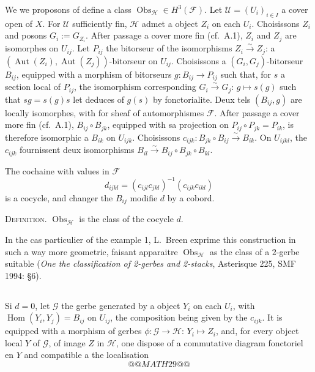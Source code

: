 \documentclass[11pt,a4paper]{article}
\theoremstyle{plain}
\theoremstyle{definition}
\DeclareMathOperator{\Hom}{Hom}
\DeclareMathOperator{\Aut}{Aut}
\DeclareMathOperator{\Obs}{Obs}
\newcommand{\iso}{\xrightarrow{\sim}}
\begin{document}
We we proposons of define a class $\Obs_{\mathcal{H}} \in H^{3}(\mathcal{F})$. Let $\mathcal{U} = (U_{i})_{i \in I}$
a cover open of $X$. For $\mathcal{U}$ sufficiently fin, $\mathcal{H}$ admet a object $Z_{i}$ on each $U_{i}$. Choisissons $Z_{i}$ and posons $G_{i} := G_{Z_{i}}$. After passage a cover more fin (cf.~A.1), $Z_{i}$ and $Z_{j}$ are isomorphes on $U_{ij}$. Let $P_{ij}$ the bitorseur of the isomorphisms $Z_{i} \iso Z_{j}$: a $(\Aut(Z_{i}), \Aut(Z_{j}))$-bitorseur on $U_{ij}$. Choisissons a $(G_{i}, G_{j})$-bitorseur $B_{ij}$, equipped with a morphism of bitorseurs $g: B_{ij} \to P_{ij}$ such that, for $s$ a section local of $P_{ij}$, the isomorphism corresponding $G_{i} \iso G_{j}$: $g \mapsto s(g)$ such that $sg = s(g)s$ let deduces of $g(s)$ by fonctorialite. Deux tels $(B_{ij}, g)$ are locally isomorphes, with for sheaf of automorphismes $\mathcal{F}$. After passage a cover more fin (cf.~A.1), $B_{ij} \circ B_{jk}$, equipped with sa projection on $P_{ij} \circ P_{jk} = P_{ik}$, is therefore isomorphic a $B_{ik}$ on $U_{ijk}$. Choisissons $c_{ijk}: B_{jk} \circ B_{ij} \iso B_{ik}$. On $U_{ijkl}$, the $c_{ijk}$ fournissent deux isomorphisms $B_{il} \iso B_{ij} \circ B_{jk} \circ B_{kl}$.

The cochaine with values in $\mathcal{F}$
\[
d_{ijkl} = (c_{ijl} c_{jkl})^{-1} (c_{ijk} c_{ikl})
\]
is a cocycle, and changer the $B_{ij}$ modifie $d$ by a cobord.

\noindent \textsc{Definition.} $\Obs_{\mathcal{H}}$ is the class of the cocycle $d$.

In the cas particulier of the example 1, L.~Breen exprime this construction in such a way more geometric, faisant apparaitre $\Obs_{\mathcal{H}}$ as the class of a $2$-gerbe suitable (\textit{One the classification of 2-gerbes and 2-stacks}, Asterisque 225, SMF
1994: \S 6).

\subsection{}
Si $d = 0$, let $\mathcal{G}$ the gerbe generated by a object $Y_{i}$ on each $U_{i}$, with
$\Hom(Y_{i}, Y_{j}) = B_{ij}$ on $U_{ij}$, the composition being given by the $c_{ijk}$. It is equipped with a morphism of gerbes $\phi: \mathcal{G} \to \mathcal{H}$: $Y_{i} \mapsto Z_{i}$, and, for every object local $Y$ of $\mathcal{G}$,
of image $Z$ in $\mathcal{H}$, one dispose of a commutative diagram fonctoriel en $Y$ and
compatible a the localisation
\[
@@MATH29@@ \tag{A.7.1}
\]
\end{document}
